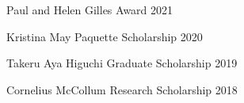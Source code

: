 Paul and Helen Gilles Award \hfill 2021

\vspace{\y}
Kristina May Paquette Scholarship \hfill 2020

\vspace{\y}
Takeru Aya Higuchi Graduate Scholarship \hfill 2019


\vspace{\y}
Cornelius McCollum Research Scholarship \hfill 2018


